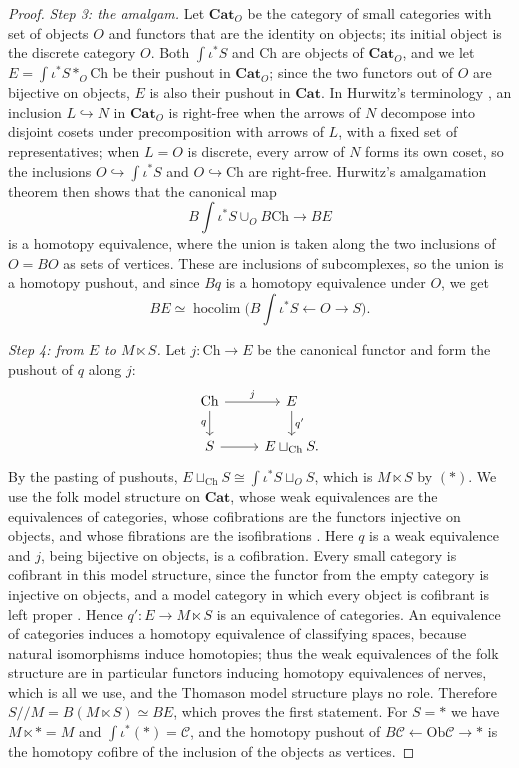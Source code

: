 \documentclass[11pt]{amsart}
\theoremstyle{definition}
\theoremstyle{remark}
\numberwithin{figure}{section}%
\DeclareMathOperator{\hocolim}{hocolim}
\newcommand{\C}{\mathcal{C}}
\newcommand{\Ob}{\mathrm{Ob}}
\newcommand{\Cat}{\mathbf{Cat}}
\begin{document}
\begin{proof}
\emph{Step 3: the amalgam.} Let $\Cat_O$ be the category of small categories with set of objects $O$ and functors that are the identity on objects; its initial object is the discrete category $O$. Both $\int\iota^*S$ and $\mathrm{Ch}$ are objects of $\Cat_O$, and we let $E=\int\iota^*S*_O\mathrm{Ch}$ be their pushout in $\Cat_O$; since the two functors out of $O$ are bijective on objects, $E$ is also their pushout in $\Cat$. In Hurwitz's terminology \cite[\S2]{Hurwitz}, an inclusion $L\hookrightarrow N$ in $\Cat_O$ is right-free when the arrows of $N$ decompose into disjoint cosets under precomposition with arrows of $L$, with a fixed set of representatives; when $L=O$ is discrete, every arrow of $N$ forms its own coset, so the inclusions $O\hookrightarrow\int\iota^*S$ and $O\hookrightarrow\mathrm{Ch}$ are right-free. Hurwitz's amalgamation theorem \cite[Thm.~2]{Hurwitz} then shows that the canonical map
\[
B\!\textstyle\int\iota^*S\cup_{O}B\mathrm{Ch}\longrightarrow BE
\]
is a homotopy equivalence, where the union is taken along the two inclusions of $O=BO$ as sets of vertices. These are inclusions of subcomplexes, so the union is a homotopy pushout, and since $Bq$ is a homotopy equivalence under $O$, we get
\[
BE\simeq\hocolim\big(B\!\textstyle\int\iota^*S\longleftarrow O\longrightarrow S\big).
\]

\emph{Step 4: from $E$ to $M\ltimes S$.} Let $j\colon\mathrm{Ch}\to E$ be the canonical functor and form the pushout of $q$ along $j$:
\[
\begin{tikzcd}
\mathrm{Ch} \arrow[r,"j"] \arrow[d,"q"'] & E \arrow[d,"q'"]\\
S \arrow[r] & E\sqcup_{\mathrm{Ch}}S.
\end{tikzcd}
\]
By the pasting of pushouts, $E\sqcup_{\mathrm{Ch}}S\cong\int\iota^*S\sqcup_O S$, which is $M\ltimes S$ by $(*)$. We use the folk model structure on $\Cat$, whose weak equivalences are the equivalences of categories, whose cofibrations are the functors injective on objects, and whose fibrations are the isofibrations \cite{JT,Rezk}. Here $q$ is a weak equivalence and $j$, being bijective on objects, is a cofibration. Every small category is cofibrant in this model structure, since the functor from the empty category is injective on objects, and a model category in which every object is cofibrant is left proper \cite[Prop.~13.1.2]{Hirschhorn}. Hence $q'\colon E\to M\ltimes S$ is an equivalence of categories. An equivalence of categories induces a homotopy equivalence of classifying spaces, because natural isomorphisms induce homotopies; thus the weak equivalences of the folk structure are in particular functors inducing homotopy equivalences of nerves, which is all we use, and the Thomason model structure plays no role. Therefore $S/\!/M=B(M\ltimes S)\simeq BE$, which proves the first statement. For $S=*$ we have $M\ltimes*=M$ and $\int\iota^*(*)=\C$, and the homotopy pushout of $B\C\leftarrow\Ob\C\to*$ is the homotopy cofibre of the inclusion of the objects as vertices.
\end{proof}
\end{document}
